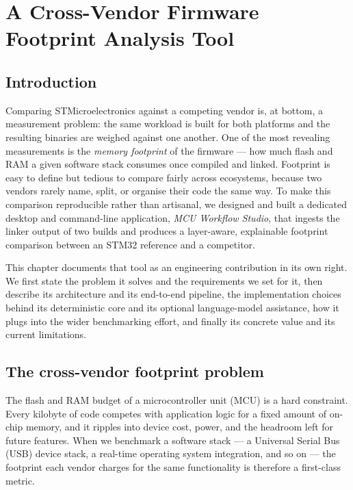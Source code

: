 \chapter{A Cross-Vendor Firmware Footprint Analysis Tool}
\label{chap:footprint-tool}

\section*{Introduction}

Comparing STMicroelectronics against a competing vendor is, at bottom, a measurement
problem: the same workload is built for both platforms and the resulting binaries are
weighed against one another. One of the most revealing measurements is the
\emph{memory footprint} of the firmware --- how much flash and RAM a given software stack
consumes once compiled and linked. Footprint is easy to define but tedious to compare
fairly across ecosystems, because two vendors rarely name, split, or organise their code
the same way. To make this comparison reproducible rather than artisanal, we designed and
built a dedicated desktop and command-line application, \emph{MCU Workflow Studio}, that
ingests the linker output of two builds and produces a layer-aware, explainable footprint
comparison between an STM32 reference and a competitor.

This chapter documents that tool as an engineering contribution in its own right. We first
state the problem it solves and the requirements we set for it, then describe its
architecture and its end-to-end pipeline, the implementation choices behind its
deterministic core and its optional language-model assistance, how it plugs into the wider
benchmarking effort, and finally its concrete value and its current limitations.

\section{The cross-vendor footprint problem}
\label{sec:tool-problem}

The flash and RAM budget of a microcontroller unit (MCU) is a hard constraint. Every
kilobyte of code competes with application logic for a fixed amount of on-chip memory, and
it ripples into device cost, power, and the headroom left for future features. When we
benchmark a software stack --- a Universal Serial Bus (USB) device stack, a real-time
operating system integration, and so on --- the footprint each vendor charges for the same
functionality is
therefore a first-class metric.

